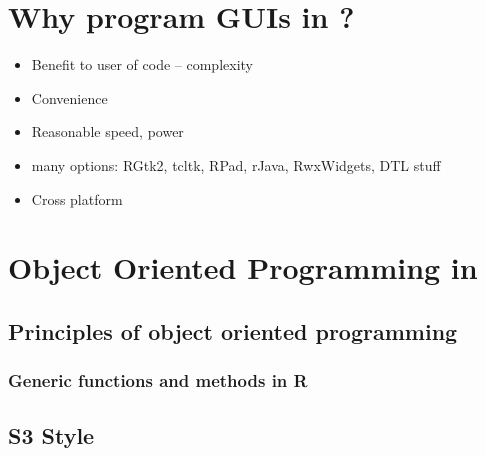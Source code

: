 \section{Why program GUIs in \R?}
\label{sec:GUIsInR}


\begin{itemize}
\item Benefit to user of code -- complexity
\item Convenience
\item Reasonable speed, power
\item many options: RGtk2, tcltk, RPad, rJava, RwxWidgets, DTL stuff
\item Cross platform
\end{itemize}


\section{Object Oriented Programming in \R}
\label{sec:OOP}

\subsection{Principles of object oriented programming}
\label{sec:princ-object-orient}

\subsubsection{Generic functions and methods in R}
\label{sec:gener-funct-meth}



\subsection{S3 Style}
\label{sec:PROG:S3}


 





